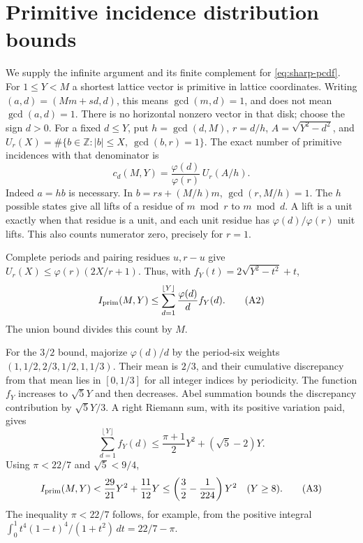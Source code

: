 \documentclass[11pt]{article}
\theoremstyle{definition}\newtheorem{definition}[theorem]{Definition}
\theoremstyle{remark}\newtheorem{remark}[theorem]{Remark}
\newcommand{\Z}{\mathbb Z}
\newcommand{\floor}[1]{\left\lfloor #1\right\rfloor}
\begin{document}
\section{Primitive incidence distribution bounds}\label{app:sharp-pcdf}
We supply the infinite argument and its finite complement for
\eqref{eq:sharp-pcdf}. For \(1\le Y<M\) a shortest lattice vector is
primitive in lattice coordinates. Writing \((a,d)=(Mm+sd,d)\),
this means \(\gcd(m,d)=1\), and does not mean \(\gcd(a,d)=1\).
There is no horizontal nonzero vector in that disk; choose the sign \(d>0\).
For a fixed \(d\le Y\), put \(h=\gcd(d,M)\), \(r=d/h\),
\(A=\sqrt{Y^2-d^2}\), and
\(U_r(X)=\#\{b\in\Z:|b|\le X,\ \gcd(b,r)=1\}\).
The exact number of primitive incidences with that denominator is
\[
 c_d(M,Y)=\frac{\varphi(d)}{\varphi(r)}\,U_r(A/h).                     \tag{A1}\label{eq:sharp-incidence}
\]
Indeed \(a=hb\) is necessary. In
\(b=rs+(M/h)m\), \(\gcd(r,M/h)=1\).
The \(h\) possible states give all lifts of a residue of \(m\bmod r\)
to \(m\bmod d\). A lift is a unit exactly when that residue is a unit,
and each unit residue has \(\varphi(d)/\varphi(r)\) unit lifts.
This also counts numerator zero, precisely for \(r=1\).

Complete periods and pairing residues \(u,r-u\) give
\(U_r(X)\le\varphi(r)(2X/r+1)\).
Thus, with \(f_Y(t)=2\sqrt{Y^2-t^2}+t\),
\[
 I_{\rm prim}(M,Y)\le
 \sum_{d=1}^{\floor Y}\frac{\varphi(d)}d f_Y(d).
                                                                    \tag{A2}\label{eq:sharp-totient-count}
\]
The union bound divides this count by \(M\).

For the \(3/2\) bound, majorize \(\varphi(d)/d\) by the period-six
weights \((1,1/2,2/3,1/2,1,1/3)\). Their mean is \(2/3\), and
their cumulative discrepancy from that mean lies in \([0,1/3]\)
for all integer indices by periodicity.
The function \(f_Y\) increases to \(\sqrt5Y\) and then decreases.
Abel summation bounds the discrepancy contribution by \(\sqrt5Y/3\).
A right Riemann sum, with its positive variation paid, gives
\[
 \sum_{d=1}^{\floor Y}f_Y(d)
 \le \frac{\pi+1}{2}Y^2+(\sqrt5-2)Y .
\]
Using \(\pi<22/7\) and \(\sqrt5<9/4\),
\[
 I_{\rm prim}(M,Y)
 <\frac{29}{21}Y^2+\frac{11}{12}Y
 \le\left(\frac32-\frac1{224}\right)Y^2\quad(Y\ge8).                  \tag{A3}
\]
The inequality \(\pi<22/7\) follows, for example, from the positive
integral \(\int_0^1t^4(1-t)^4/(1+t^2)\,dt=22/7-\pi\).
\end{document}
